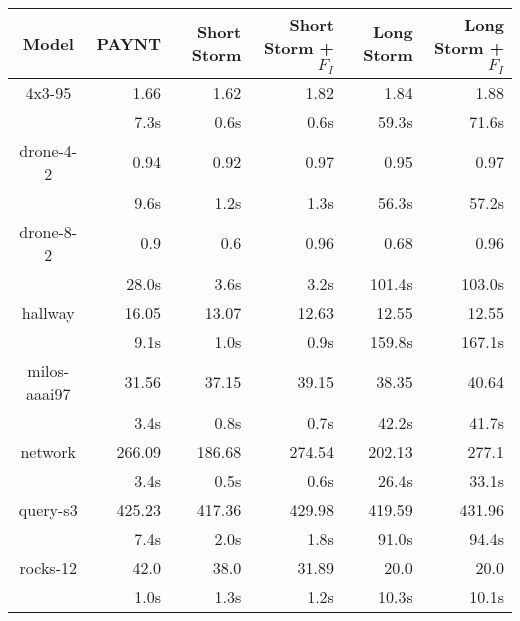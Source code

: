 \begin{table}
\begin{tabular}{|c|r|r|r|r|r|}
\hline

Model & PAYNT & Short Storm & Short Storm + $F_{I}$ & Long Storm & Long Storm + $F_{I}$ \\ \hline 

4x3-95 & 1.66 & 1.62 & 1.82 & 1.84 & 1.88 \\
 & 7.3s & 0.6s & 0.6s & 59.3s & 71.6s \\
\hline
drone-4-2 & 0.94 & 0.92 & 0.97 & 0.95 & 0.97 \\
 & 9.6s & 1.2s & 1.3s & 56.3s & 57.2s \\
\hline
drone-8-2 & 0.9 & 0.6 & 0.96 & 0.68 & 0.96 \\
 & 28.0s & 3.6s & 3.2s & 101.4s & 103.0s \\
\hline
hallway & 16.05 & 13.07 & 12.63 & 12.55 & 12.55 \\
 & 9.1s & 1.0s & 0.9s & 159.8s & 167.1s \\
\hline
milos-aaai97 & 31.56 & 37.15 & 39.15 & 38.35 & 40.64 \\
 & 3.4s & 0.8s & 0.7s & 42.2s & 41.7s \\
\hline
network & 266.09 & 186.68 & 274.54 & 202.13 & 277.1 \\
 & 3.4s & 0.5s & 0.6s & 26.4s & 33.1s \\
\hline
query-s3 & 425.23 & 417.36 & 429.98 & 419.59 & 431.96 \\
 & 7.4s & 2.0s & 1.8s & 91.0s & 94.4s \\
\hline
rocks-12 & 42.0 & 38.0 & 31.89 & 20.0 & 20.0 \\
 & 1.0s & 1.3s & 1.2s & 10.3s & 10.1s \\
\hline
\end{tabular}
\end{table}

